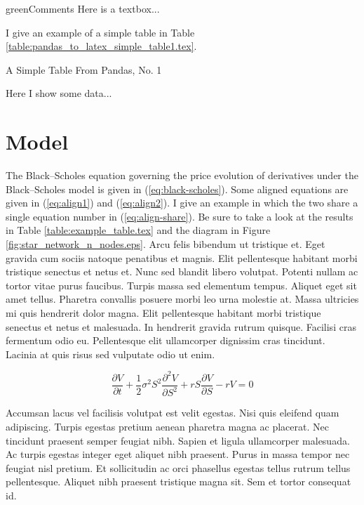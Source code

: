 \documentclass[12pt]{article}
\begin{document}
\begin{textbox}{green}{Comments}
Here is a textbox...
\end{textbox}

I give an example of a simple table in Table \ref{table:pandas_to_latex_simple_table1.tex}.


\begin{table}
\caption{A Simple Table From Pandas, No. 1}
\centering

\caption*{
  Here I show some data...
}
\label{table:pandas_to_latex_simple_table1.tex}
\end{table}


\section{Model}

The Black–Scholes equation governing the price evolution of derivatives under
the Black–Scholes model is given in (\ref{eq:black-scholes}). Some aligned
equations are given in (\ref{eq:align1}) and (\ref{eq:align2}). I give an
example in which the two share a single equation number in
(\ref{eq:align-share}). Be sure to take a look at the results in 
Table \ref{table:example_table.tex} and the diagram in 
Figure \ref{fig:star_network_n_nodes.eps}.
Arcu felis bibendum ut tristique et. Eget gravida
cum sociis natoque penatibus et magnis. Elit pellentesque habitant morbi
tristique senectus et netus et.
Nunc sed blandit libero volutpat.
Potenti nullam ac tortor vitae purus faucibus. Turpis massa sed elementum
tempus. Aliquet eget sit amet tellus. Pharetra convallis posuere morbi leo
urna molestie at. Massa ultricies mi quis hendrerit dolor magna. Elit
pellentesque habitant morbi tristique senectus et netus et malesuada. In
hendrerit gravida rutrum quisque. Facilisi cras fermentum odio eu.
Pellentesque elit ullamcorper dignissim cras tincidunt. Lacinia at quis
risus sed vulputate odio ut enim. 

\begin{equation}
\frac{\partial V}{\partial t} + \frac{1}{2}\sigma^2 S^2 \frac{\partial^2 V}{\partial S^2} 
+ rS\frac{\partial V}{\partial S} - rV = 0
\label{eq:black-scholes}
\end{equation}

Accumsan lacus vel facilisis volutpat est velit egestas. Nisi quis eleifend
quam adipiscing. Turpis egestas pretium aenean pharetra magna ac placerat.
Nec tincidunt praesent semper feugiat nibh. Sapien et ligula ullamcorper
malesuada. Ac turpis egestas integer eget aliquet nibh praesent. Purus in
massa tempor nec feugiat nisl pretium. Et sollicitudin ac orci phasellus
egestas tellus rutrum tellus pellentesque. Aliquet nibh praesent tristique
magna sit. Sem et tortor consequat id.
\end{document}
